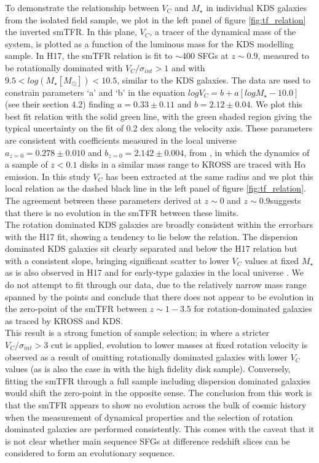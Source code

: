 \documentclass[fleqn,usenatbib]{mn2e}
\begin{document}
To demonstrate the relationship between $V_{C}$ and $M_{\star}$ in individual KDS galaxies from the isolated field sample, we plot in the left panel of figure \ref{fig:tf_relation} the inverted smTFR.
In this plane, $V_{C}$, a tracer of the dynamical mass of the system, is plotted as a function of the luminous mass for the KDS modelling sample.
In H17, the smTFR relation is fit to $\sim400$ SFGs at $z\sim0.9$, measured to be rotationally dominated with $V_{C}/\sigma_{int} > 1$ and with $9.5 < log(M_{\star}[M_{\odot}]) < 10.5$, similar to the KDS galaxies.
The data are used to constrain parameters `a' and `b' in the equation $logV_{C}=b+a[logM_{\star} - 10.0]$ (see their section 4.2) finding $a = 0.33 \pm 0.11$ and $b = 2.12 \pm 0.04$.
We plot this best fit relation with the solid green line, with the green shaded region giving the typical uncertainty on the fit of 0.2 dex along the velocity axis.
These parameters are consistent with coefficients measured in the local universe $a_{z=0} = 0.278 \pm 0.010$ and $b_{z=0} = 2.142 \pm 0.004$, from \cite{Reyes2011}, in which the dynamics of a sample of $z<0.1$ disks in a similar mass range to KROSS are traced with H$\alpha$ emission.
In this study $V_{C}$ has been extracted at the same radius and we plot this local relation as the dashed black line in the left panel of figure \ref{fig:tf_relation}.
The agreement between these parameters derived at $z\sim0$ and $z\sim0.9$suggests that there is no evolution in the smTFR between these limits. \\

The rotation dominated KDS galaxies are broadly consistent within the errorbars with the H17 fit, showing a tendency to lie below the relation.
The dispersion dominated KDS galaxies sit clearly separated and below the H17 relation but with a consistent slope, bringing significant scatter to lower $V_{C}$ values at fixed $M_{\star}$ as is also observed in H17 and for early-type galaxies in the local universe \citep[e.g.][]{Romanowsky2012}.  
We do not attempt to fit through our data, due to the relatively narrow mass range spanned by the points and conclude that there does not appear to be evolution in the zero-point of the smTFR between $z\sim1-3.5$ for rotation-dominated galaxies as traced by KROSS and KDS. \\

This result is a strong function of sample selection; in \cite{Tiley2016a} where a stricter $V_{C}/\sigma_{int} > 3$ cut is applied, evolution to lower masses at fixed rotation velocity is observed as a result of omitting rotationally dominated galaxies with lower $V_{C}$ values (as is also the case in \cite{Cresci2009} with the high fidelity disk sample).
Conversely, fitting the smTFR through a full sample including dispersion dominated galaxies would shift the zero-point in the opposite sense.
The conclusion from this work is that the smTFR appears to show no evolution across the bulk of cosmic history when the measurement of dynamical properties and the selection of rotation dominated galaxies are performed consistently.
This comes with the caveat that it is not clear whether main sequence SFGs at difference redshift slices can be considered to form an evolutionary sequence. \\
\end{document}
